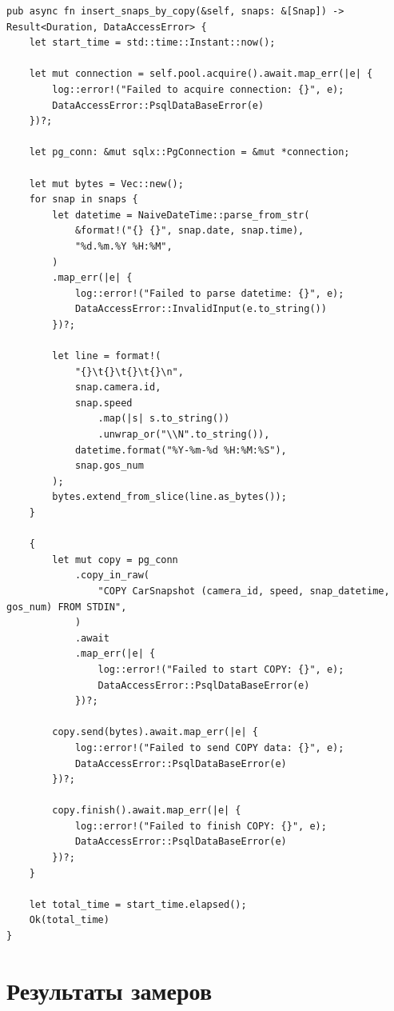 \begin{center}
\captionsetup{justification=raggedright,singlelinecheck=off}
\begin{lstlisting}[label=lst:ins_by_copy, caption=Массовая загрузка через COPY]
pub async fn insert_snaps_by_copy(&self, snaps: &[Snap]) -> Result<Duration, DataAccessError> {
    let start_time = std::time::Instant::now();

    let mut connection = self.pool.acquire().await.map_err(|e| {
        log::error!("Failed to acquire connection: {}", e);
        DataAccessError::PsqlDataBaseError(e)
    })?;

    let pg_conn: &mut sqlx::PgConnection = &mut *connection;

    let mut bytes = Vec::new();
    for snap in snaps {
        let datetime = NaiveDateTime::parse_from_str(
            &format!("{} {}", snap.date, snap.time),
            "%d.%m.%Y %H:%M",
        )
        .map_err(|e| {
            log::error!("Failed to parse datetime: {}", e);
            DataAccessError::InvalidInput(e.to_string())
        })?;

        let line = format!(
            "{}\t{}\t{}\t{}\n",
            snap.camera.id,
            snap.speed
                .map(|s| s.to_string())
                .unwrap_or("\\N".to_string()),
            datetime.format("%Y-%m-%d %H:%M:%S"),
            snap.gos_num
        );
        bytes.extend_from_slice(line.as_bytes());
    }

    {
        let mut copy = pg_conn
            .copy_in_raw(
                "COPY CarSnapshot (camera_id, speed, snap_datetime, gos_num) FROM STDIN",
            )
            .await
            .map_err(|e| {
                log::error!("Failed to start COPY: {}", e);
                DataAccessError::PsqlDataBaseError(e)
            })?;

        copy.send(bytes).await.map_err(|e| {
            log::error!("Failed to send COPY data: {}", e);
            DataAccessError::PsqlDataBaseError(e)
        })?;

        copy.finish().await.map_err(|e| {
            log::error!("Failed to finish COPY: {}", e);
            DataAccessError::PsqlDataBaseError(e)
        })?;
    }

    let total_time = start_time.elapsed();
    Ok(total_time)
}
\end{lstlisting}
\end{center}

\section{Результаты замеров}

